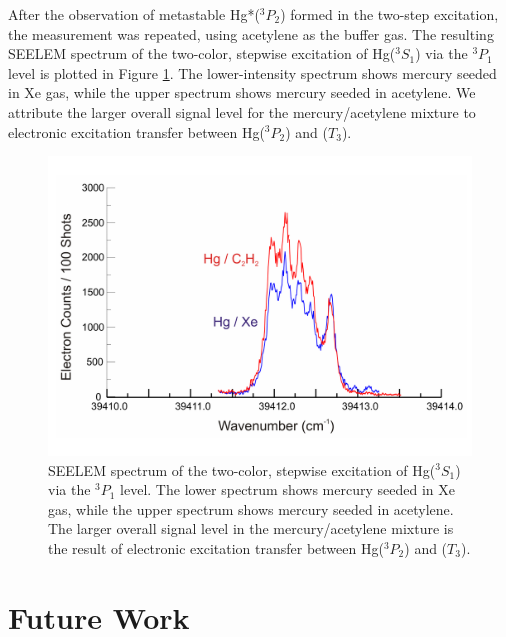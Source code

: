 \documentclass[12pt]{mitthesis}
\begin{document}
After the observation of metastable Hg*($^3P_2$) formed in the
two-step excitation, the measurement was repeated, using acetylene as
the buffer gas.  The resulting SEELEM spectrum of the two-color,
stepwise excitation of Hg($^3S_1$) via the $^3P_1$ level is plotted in
Figure \ref{fig:hg-twostep-c2h2}.  The lower-intensity spectrum shows
mercury seeded in Xe gas, while the upper spectrum shows mercury
seeded in acetylene.  We attribute the larger overall signal level for
the mercury/acetylene mixture to electronic excitation transfer
between Hg($^3P_2$) and ($T_3$).

\begin{figure}
  \caption{SEELEM spectrum of the two-color, stepwise excitation of
    Hg($^3S_1$) via the $^3P_1$ level.  The lower spectrum shows
    mercury seeded in Xe gas, while the upper spectrum shows mercury
    seeded in acetylene.  The larger overall signal level in the
    mercury/acetylene mixture is the result of electronic excitation
    transfer between Hg($^3P_2$) and ($T_3$).}
  \label{fig:hg-twostep-c2h2}
  \centering
  \includegraphics[width=8in,angle=90]{hg-twostep-c2h2.pdf}
\end{figure}


\section{Future Work}
\end{document}
